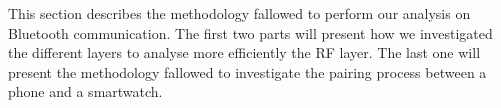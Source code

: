 This section describes the methodology fallowed to perform our analysis on Bluetooth communication. The first two parts will present how we investigated the different layers to analyse more efficiently the RF layer. The last one will present the methodology fallowed to investigate the pairing process between a phone and a smartwatch. 